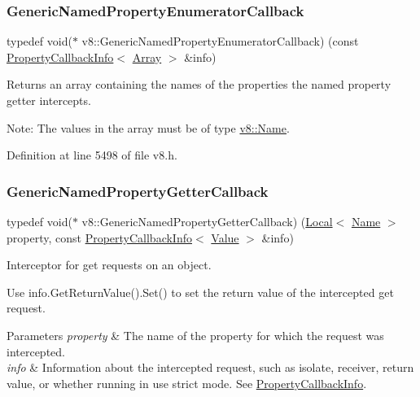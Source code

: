 \subsubsection{\texorpdfstring{Generic\+Named\+Property\+Enumerator\+Callback}{GenericNamedPropertyEnumeratorCallback}}
{\footnotesize\ttfamily typedef void($\ast$ v8\+::\+Generic\+Named\+Property\+Enumerator\+Callback) (const \mbox{\hyperlink{classv8_1_1PropertyCallbackInfo}{Property\+Callback\+Info}}$<$ \mbox{\hyperlink{classv8_1_1Array}{Array}} $>$ \&info)}

Returns an array containing the names of the properties the named property getter intercepts.

Note\+: The values in the array must be of type \mbox{\hyperlink{classv8_1_1Name}{v8\+::\+Name}}. 

Definition at line 5498 of file v8.\+h.

\mbox{\label{namespacev8_a24b1801fa53a7c5a71366d8044927563}} 
\subsubsection{\texorpdfstring{Generic\+Named\+Property\+Getter\+Callback}{GenericNamedPropertyGetterCallback}}
{\footnotesize\ttfamily typedef void($\ast$ v8\+::\+Generic\+Named\+Property\+Getter\+Callback) (\mbox{\hyperlink{classv8_1_1Local}{Local}}$<$ \mbox{\hyperlink{classv8_1_1Name}{Name}} $>$ property, const \mbox{\hyperlink{classv8_1_1PropertyCallbackInfo}{Property\+Callback\+Info}}$<$ \mbox{\hyperlink{classv8_1_1Value}{Value}} $>$ \&info)}

Interceptor for get requests on an object.

Use {\ttfamily info.\+Get\+Return\+Value().Set()} to set the return value of the intercepted get request.


\begin{DoxyParams}{Parameters}
{\em property} & The name of the property for which the request was intercepted. \\
\hline
{\em info} & Information about the intercepted request, such as isolate, receiver, return value, or whether running in {\ttfamily \textquotesingle{}use strict}\textquotesingle{} mode. See {\ttfamily \mbox{\hyperlink{classv8_1_1PropertyCallbackInfo}{Property\+Callback\+Info}}}.\\
\hline
\end{DoxyParams}

